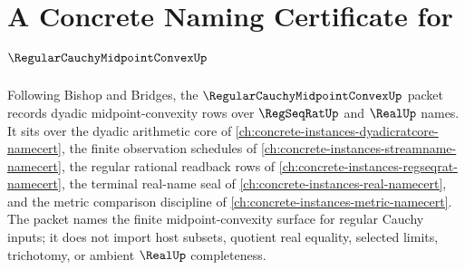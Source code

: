 \chapter{A Concrete Naming Certificate for $\RegularCauchyMidpointConvexUp$}
\label{ch:concrete-instances-regular-cauchy-midpoint-convex-namecert}

Following Bishop and Bridges, the $\RegularCauchyMidpointConvexUp$ packet records dyadic midpoint-convexity rows over $\RegSeqRatUp$ and $\RealUp$ names. It sits over the dyadic arithmetic core of \autoref{ch:concrete-instances-dyadicratcore-namecert}, the finite observation schedules of \autoref{ch:concrete-instances-streamname-namecert}, the regular rational readback rows of \autoref{ch:concrete-instances-regseqrat-namecert}, the terminal real-name seal of \autoref{ch:concrete-instances-real-namecert}, and the metric comparison discipline of \autoref{ch:concrete-instances-metric-namecert}. The packet names the finite midpoint-convexity surface for regular Cauchy inputs; it does not import host subsets, quotient real equality, selected limits, trichotomy, or ambient $\RealUp$ completeness.

